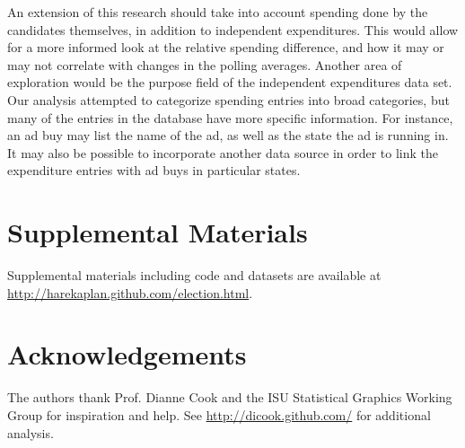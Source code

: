 \documentclass[11pt]{article}\usepackage{graphicx, color}
\begin{document}
An extension of this research should take into account spending done by the candidates themselves, in addition to independent expenditures. This would allow for a more informed look at the relative spending difference, and how it may or may not correlate with changes in the polling averages. Another area of exploration would be the purpose field of the independent expenditures data set. Our analysis attempted to categorize spending entries into broad categories, but many of the entries in the database have more specific information. For instance, an ad buy may list the name of the ad, as well as the state the ad is running in. It may also be possible to incorporate another data source in order to link the expenditure entries with ad buys in particular states.

\section{Supplemental Materials}
Supplemental materials including code and datasets are available at \url{http://harekaplan.github.com/election.html}.

\section{Acknowledgements}
The authors thank Prof. Dianne Cook and the ISU Statistical Graphics Working Group for inspiration and help. See \url{http://dicook.github.com/} for additional analysis.

\printbibliography
\end{document}
